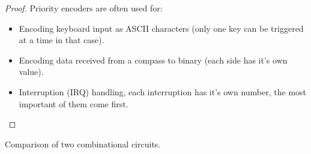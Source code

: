 \begin{proof}
\vspace{0.3cm}
Priority encoders are often used for:
\begin{itemize}
	\item Encoding keyboard input as ASCII characters (only one key can be triggered at a time in that case).
	\item Encoding data received from a compass to binary (each side has it's own value).
	\item Interruption (IRQ) handling, each interruption has it's own number, the most important of them come first.
\end{itemize}
\end{proof}



\begin{problem}
	Comparison of two combinational circuits.
\end{problem}

